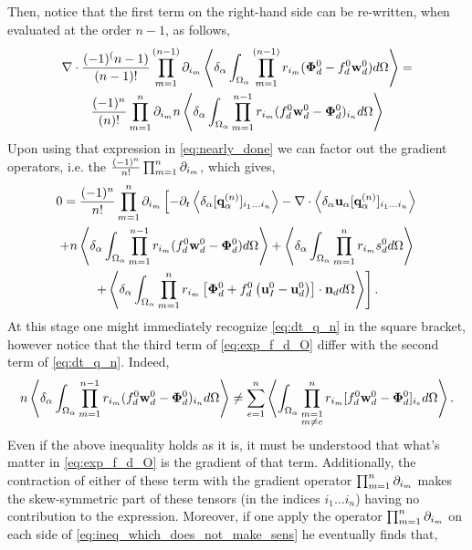 Then, notice that the first term on the right-hand side can be re-written, when evaluated at the order $n-1$, as follows,
\begin{multline*}
    \div \expo[(n-1)]{(\bm\Phi_d^0 - f_d^0 \textbf{w}_d^0)}
    = \\
    \frac{(-1)^{n}}{{(n)}!} \partialp{1}{n}  n \pOavg{ \pri{1}{n-1}(f_d^0 \textbf{w}_d^0 - \bm\Phi_d^0)_{i_{n}} }
\end{multline*} 
Upon using that expression in \ref{eq:nearly_done} we can factor out the gradient operators, i.e. the $\frac{(-1)^n}{n!} \partialp{1}{n}$, which gives, 
\begin{multline}
    0 = \frac{(-1)^n}{n!}
    \partialp{1}{n}
    \left[
        - \partial_t
        \pavg{[\textbf{q}_\alpha^{(n)}]_{i_1\ldots i_n}}
        - \div \pavg{\textbf{u}_\alpha [\textbf{q}_\alpha^{(n)}]_{i_1\ldots i_n}}
    \right.\\\left.
        +n\pavg{\int_{\Omega_\alpha} \pri{1}{n-1} (f_d^0 \textbf{w}_d^0-\bm\Phi_d^0) d\Omega}
        +\pavg{\int_{\Omega_\alpha} \pri{1}{n} s_d^0 d\Omega}
        \right.\\\left.
        +\pavg{\int_{\Omega_\alpha} \pri{1}{n} \left[
            \bm\Phi_d^0
            + f_d^0
            \left(
                \textbf{u}_I^0
                - \textbf{u}_d^0
            \right)
        \right]
        \cdot \textbf{n}_d d\Omega}
    \right].
    \label{eq:exp_f_d_O}
\end{multline}
At this stage one might immediately recognize \ref{eq:dt_q_n} in the square bracket, however notice that the third term of \ref{eq:exp_f_d_O} differ with the second term of \ref{eq:dt_q_n}. 
Indeed, 
\begin{equation*}
    n\pavg{\int_{\Omega_\alpha} \pri{1}{n-1} ( f_d^0 \textbf{w}_d^0-\bm\Phi_d^0)_{i_n} d\Omega}
    \neq
    \sum_{e=1}^{n} 
    \avg{
        \intO{
        \prod^{n}_{\substack{ m=1 \\m \neq e}} r_{i_m} [f_d^0 \textbf{w}_d^0  - \bm\Phi_d^0]_{i_e}
        }
    }. 
    \label{eq:ineq_which_does_not_make_sens}
\end{equation*}
Even if the above inequality holds as it is, it must be understood that what's matter in \ref{eq:exp_f_d_O} is the gradient of that term. 
Additionally, the contraction of either of these term with the gradient operator $\partialp{1}{n}$ makes the skew-symmetric part of these tensors (in the indices $i_1\ldots i_n$) having no contribution to the expression.
Moreover, if one apply the operator $\partialp{1}{n}$ on each side of \ref{eq:ineq_which_does_not_make_sens} he eventually finds that, 
